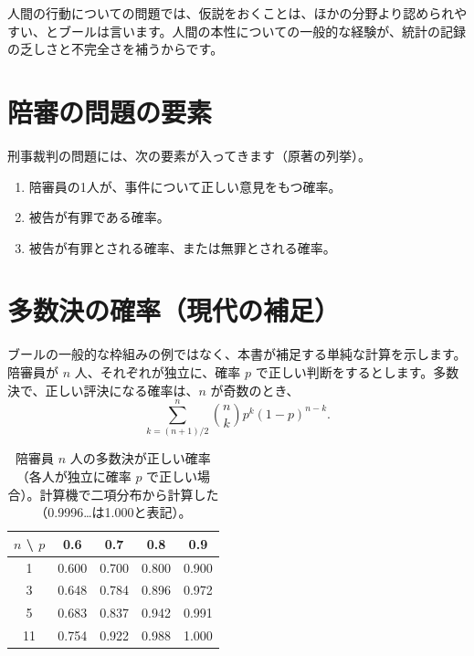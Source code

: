 \documentclass[a4paper,11pt,openany]{ltjsbook}
\begin{document}
人間の行動についての問題では、仮説をおくことは、ほかの分野より認められやすい、とブールは言います。人間の本性についての一般的な経験が、統計の記録の乏しさと不完全さを補うからです。

\section{陪審の問題の要素}

刑事裁判の問題には、次の要素が入ってきます（原著の列挙）。

\begin{enumerate}[leftmargin=*]
\item 陪審員の1人が、事件について正しい意見をもつ確率。
\item 被告が有罪である確率。
\item 被告が有罪とされる確率、または無罪とされる確率。
\end{enumerate}

\section{多数決の確率（現代の補足）}

ブールの一般的な枠組みの例ではなく、本書が補足する単純な計算を示します。陪審員が $n$ 人、それぞれが独立に、確率 $p$ で正しい判断をするとします。多数決で、正しい評決になる確率は、$n$ が奇数のとき、
\[
\sum_{k=(n+1)/2}^{n}\binom nk p^k(1-p)^{n-k}.
\]

\begin{table}[htbp]
\centering
\begin{tabular}{c|cccc}
\toprule
$n$ \textbackslash{} $p$ & 0.6 & 0.7 & 0.8 & 0.9\\
\midrule
1 & 0.600 & 0.700 & 0.800 & 0.900\\
3 & 0.648 & 0.784 & 0.896 & 0.972\\
5 & 0.683 & 0.837 & 0.942 & 0.991\\
11 & 0.754 & 0.922 & 0.988 & 1.000\\
\bottomrule
\end{tabular}
\caption{陪審員 $n$ 人の多数決が正しい確率（各人が独立に確率 $p$ で正しい場合）。計算機で二項分布から計算した（0.9996…は1.000と表記）。}
\end{table}
\end{document}
